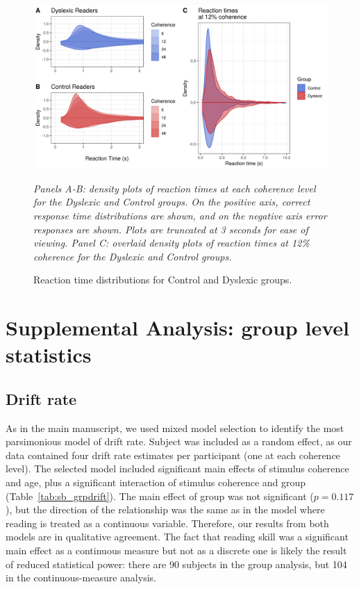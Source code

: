 \documentclass[..\uwthesis.tex]{subfiles}
\begin{document}
\begin{figure}
    \centering
    \caption{Reaction time distributions for Control and Dyslexic groups.}
    \label{fig:suppb_2}
    \includegraphics[width = 16 cm]{images/appendix_b/S2_Figure.png}
    \item \textit{Panels A-B: density plots of reaction times at each coherence level for the Dyslexic and Control groups. On the positive axis, correct response time distributions are shown, and on the negative axis error responses are shown. Plots are truncated at 3 seconds for ease of viewing. Panel C: overlaid density plots of reaction times at 12\% coherence for the Dyslexic and Control groups.}
\end{figure}

\section{Supplemental Analysis: group level statistics}
\subsection{Drift rate} As in the main manuscript, we used mixed model selection to identify the most parsimonious model of drift rate. Subject was included as a random effect, as our data contained four drift rate estimates per participant (one at each coherence level). The selected model included significant main effects of stimulus coherence and age, plus a significant interaction of stimulus coherence and group (Table~\ref{tab:sb_grpdrift}). The main effect of group was not significant ($p = 0.117$), but the direction of the relationship was the same as in the model where reading is treated as a continuous variable. Therefore, our results from both models are in qualitative agreement. The fact that reading skill was a significant main effect as a continuous measure but not as a discrete one is likely the result of reduced statistical power: there are 90 subjects in the group analysis, but 104 in the continuous-measure analysis. 
\end{document}
